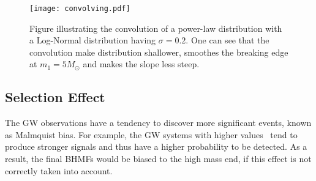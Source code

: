 \documentclass[twocolumn]{aastex62}
\begin{document}
\begin{figure}%
\texttt{[image: convolving.pdf]}
\caption{
Figure illustrating the convolution of a power-law distribution with a Log-Normal distribution having $\sigma = 0.2$. One can see that the convolution make distribution shallower, smoothes the breaking edge at $m_1 = 5 M_{\odot}$ and makes the slope less steep.
}
\label{fig:result_slope}
\end{figure}

\subsection{Selection Effect}\label{sec_likelihood_sf}
The GW observations have a tendency to discover more significant events, known as Malmquist bias. For example, the GW systems with higher values \mone\ tend to produce stronger signals and thus have a higher probability to be detected. As a result, the final BHMFs would be biased to the high mass end, if this effect is not correctly taken into account.
\end{document}
